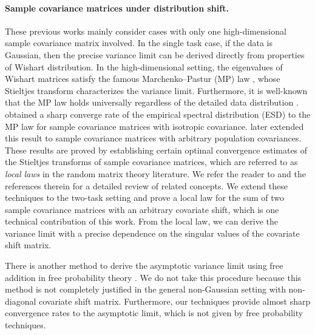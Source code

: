 \paragraph{Sample covariance matrices under distribution shift.}
These previous works mainly consider cases with only one high-dimensional sample covariance matrix involved. %
In the single task case, if the data is Gaussian, then the precise variance limit can be derived directly from properties of Wishart distribution. In the high-dimensional setting, the eigenvalues of Wishart matrices satisfy the famous Marchenko–Pastur (MP) law \cite{MP}, whose Stieltjes transform characterizes the variance limit. Furthermore, it is well-known that the MP law holds universally regardless of the detailed data distribution \cite{bai2010spectral}. \cite{isotropic} obtained a sharp converge rate of the empirical spectral distribution (ESD) to the MP law for sample covariance matrices with isotropic covariance. \cite{Anisotropic,DY} later extended this result to sample covariance matrices with arbitrary population covariances. These results are proved by establishing certain optimal convergence estimates of the Stieltjes transforms of sample covariance matrices, which are referred to as \emph{local laws} in the random matrix theory literature. We refer the reader to \cite{erdos2017dynamical} and the references therein for a detailed review of related concepts. We extend these techniques to the two-task setting and prove a local law for the sum of two sample covariance matrices with an arbitrary covariate shift, which is one technical contribution of this work. From the local law, we can derive the variance limit with a precise dependence on the singular values of the covariate shift matrix. 




There is another method to derive the asymptotic variance limit using free addition in free probability theory \cite{nica2006lectures}. We do not take this procedure because this method is not completely justified in the general non-Gaussian setting with non-diagonal covariate shift matrix. 
Furthermore, our techniques provide almost sharp convergence rates to the asymptotic limit, which is not given by free probability techniques. 

